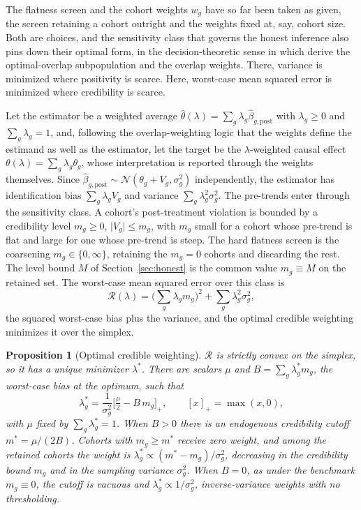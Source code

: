 \documentclass[12pt]{article}
\newtheorem{proposition}{Proposition}
\theoremstyle{remark}
\begin{document}
The flatness screen and the cohort weights $w_g$ have so far been taken as given, the screen retaining a
cohort outright and the weights fixed at, say, cohort size. Both are choices, and the sensitivity class
that governs the honest inference also pins down their optimal form, in the decision-theoretic sense in
which \citet{crump2009} derive the optimal-overlap subpopulation and \citet{li2018} the overlap weights.
There, variance is minimized where positivity is scarce. Here, worst-case mean squared error is minimized
where credibility is scarce.

Let the estimator be a weighted average $\hat\theta(\lambda)=\sum_g\lambda_g\hat\beta_{g,\mathrm{post}}$
with $\lambda_g\ge0$ and $\sum_g\lambda_g=1$, and, following the overlap-weighting logic that the weights
define the estimand as well as the estimator, let the target be the $\lambda$-weighted causal effect
$\theta(\lambda)=\sum_g\lambda_g\theta_g$, whose interpretation is reported through the weights themselves.
Since $\hat\beta_{g,\mathrm{post}}\sim\mathcal N(\theta_g+V_g,\sigma_g^2)$ independently, the estimator has
identification bias $\sum_g\lambda_g V_g$ and variance $\sum_g\lambda_g^2\sigma_g^2$. The pre-trends enter
through the sensitivity class. A cohort's post-treatment violation is bounded by a credibility level
$m_g\ge0$, $\lvert V_g\rvert\le m_g$, with $m_g$ small for a cohort whose pre-trend is flat and large for
one whose pre-trend is steep. The hard flatness screen is the coarsening $m_g\in\{0,\infty\}$, retaining
the $m_g=0$ cohorts and discarding the rest. The level bound $M$ of Section~\ref{sec:honest} is the common
value $m_g\equiv M$ on the retained set. The worst-case mean squared error over this class is
\[
\mathcal R(\lambda)=\Big(\sum_g\lambda_g m_g\Big)^2+\sum_g\lambda_g^2\sigma_g^2,
\]
the squared worst-case bias plus the variance, and the optimal credible weighting minimizes it over the
simplex.

\begin{proposition}[Optimal credible weighting]\label{prop:optimal}
$\mathcal R$ is strictly convex on the simplex, so it has a unique minimizer $\lambda^\ast$. There are
scalars $\mu$ and $B=\sum_g\lambda_g^\ast m_g$, the worst-case bias at the optimum, such that
\[
\lambda_g^\ast=\frac{1}{\sigma_g^2}\Big[\tfrac{\mu}{2}-B\,m_g\Big]_+,\qquad [x]_+=\max(x,0),
\]
with $\mu$ fixed by $\sum_g\lambda_g^\ast=1$. When $B>0$ there is an endogenous credibility cutoff
$m^\ast=\mu/(2B)$. Cohorts with $m_g\ge m^\ast$ receive zero weight, and among the retained cohorts the
weight is $\lambda_g^\ast\propto(m^\ast-m_g)/\sigma_g^2$, decreasing in the credibility bound $m_g$ and in
the sampling variance $\sigma_g^2$. When $B=0$, as under the benchmark $m_g\equiv0$, the cutoff is vacuous
and $\lambda_g^\ast\propto1/\sigma_g^2$, inverse-variance weights with no thresholding.
\end{proposition}
\end{document}
